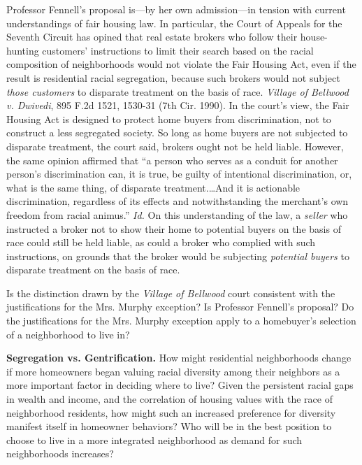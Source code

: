 \begin{questions}[]
Professor Fennell's proposal is---by her own admission---in tension with current
understandings of fair housing law. In particular, the Court of Appeals for the
Seventh Circuit has opined that real estate brokers who follow their
house-hunting customers' instructions to limit their search based on the racial
composition of neighborhoods would not violate the Fair Housing Act, even if
the result is residential racial segregation, because such brokers would not
subject \textit{those customers} to disparate treatment on the basis of race.
\textit{Village of Bellwood v. Dwivedi}, 895 F.2d 1521, 1530-31 (7th Cir.
1990). In the court's view, the Fair Housing Act is designed to protect home
buyers from discrimination, not to construct a less segregated society. So long
as home buyers are not subjected to disparate treatment, the court said,
brokers ought not be held liable. However, the same opinion affirmed that ``a
person who serves as a conduit for another person's discrimination can, it is
true, be guilty of intentional discrimination, or, what is the same thing, of
disparate treatment.\dots And it is actionable discrimination, regardless of
its effects and notwithstanding the merchant's own freedom from racial
animus.'' \textit{Id.} On this understanding of the law, a \textit{seller} who
instructed a broker not to show their home to potential buyers on the basis of
race could still be held liable, as could a broker who complied with such
instructions, on grounds that the broker would be subjecting \textit{potential
buyers} to disparate treatment on the basis of race.

Is the distinction drawn by the \textit{Village of Bellwood} court consistent
with the justifications for the Mrs. Murphy exception? Is Professor Fennell's
proposal? Do the justifications for the Mrs. Murphy exception apply to a
homebuyer's selection of a neighborhood to live in?


\item \textbf{Segregation vs. Gentrification.} How might residential
neighborhoods change if more homeowners began valuing racial diversity among
their neighbors as a more important factor in deciding where to live? Given the
persistent racial gaps in wealth and income, and the correlation of housing
values with the race of neighborhood residents, how might such an increased
preference for diversity manifest itself in homeowner behaviors? Who will be in
the best position to choose to live in a more integrated neighborhood as demand
for such neighborhoods increases?


\end{questions}
